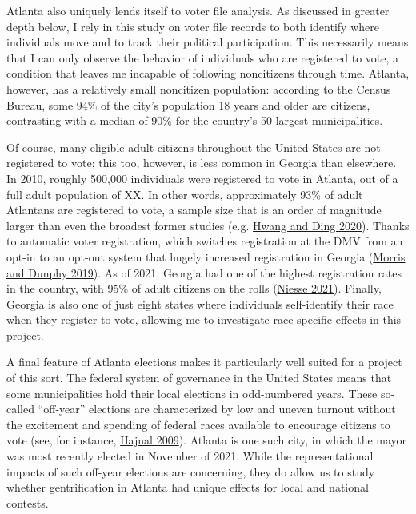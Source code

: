 \documentclass[
  12pt,
]{article}
\begin{document}
Atlanta also uniquely lends itself to voter file analysis. As discussed in greater depth below, I rely in this study on voter file records to both identify where individuals move and to track their political participation. This necessarily means that I can only observe the behavior of individuals who are registered to vote, a condition that leaves me incapable of following noncitizens through time. Atlanta, however, has a relatively small noncitizen population: according to the Census Bureau, some 94\% of the city's population 18 years and older are citizens, contrasting with a median of 90\% for the country's 50 largest municipalities.

Of course, many eligible adult citizens throughout the United States are not registered to vote; this too, however, is less common in Georgia than elsewhere. In 2010, roughly 500,000 individuals were registered to vote in Atlanta, out of a full adult population of XX. In other words, approximately 93\% of adult Atlantans are registered to vote, a sample size that is an order of magnitude larger than even the broadest former studies (e.g. \protect\hyperlink{ref-Hwang2020}{Hwang and Ding 2020}). Thanks to automatic voter registration, which switches registration at the DMV from an opt-in to an opt-out system that hugely increased registration in Georgia (\protect\hyperlink{ref-Morris2019a}{Morris and Dunphy 2019}). As of 2021, Georgia had one of the highest registration rates in the country, with 95\% of adult citizens on the rolls (\protect\hyperlink{ref-Niesse2021a}{Niesse 2021}). Finally, Georgia is also one of just eight states where individuals self-identify their race when they register to vote, allowing me to investigate race-specific effects in this project.

A final feature of Atlanta elections makes it particularly well suited for a project of this sort. The federal system of governance in the United States means that some municipalities hold their local elections in odd-numbered years. These so-called ``off-year'' elections are characterized by low and uneven turnout without the excitement and spending of federal races available to encourage citizens to vote (see, for instance, \protect\hyperlink{ref-Hajnal2009}{Hajnal 2009}). Atlanta is one such city, in which the mayor was most recently elected in November of 2021. While the representational impacts of such off-year elections are concerning, they do allow us to study whether gentrification in Atlanta had unique effects for local and national contests.
\end{document}
